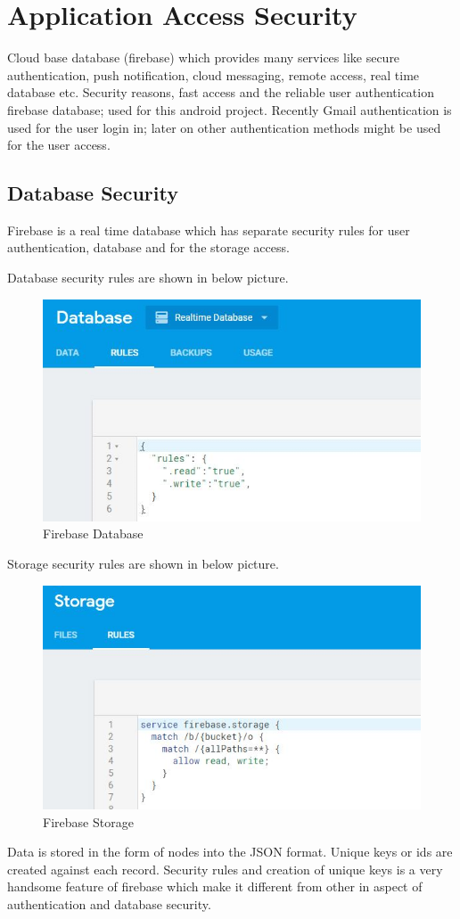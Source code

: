 \section{Application Access Security}
Cloud base database (firebase) which provides many services like secure authentication, push notification, cloud messaging, remote access, real time database etc. Security reasons, fast access and the reliable user authentication firebase database; used for this android project. Recently Gmail authentication is used for the user login in; later on other authentication methods might be used for the user access. 
\subsection{Database Security}
Firebase is a real time database which has separate security rules for user authentication, database and for the storage access. 

Database security rules are shown in below picture.

\begin{figure}[H]
 \centering
  \includegraphics[scale=0.3]{asd}
  \caption{Firebase Database}
\end{figure}
	
Storage security rules are shown in below picture.
\begin{figure}[H]
\centering
 \includegraphics[scale=0.3]{dfg}
  \caption{Firebase Storage}
\end{figure}
Data is stored in the form of nodes into the JSON format. Unique keys or ids are created against each record. Security rules and creation of unique keys is a very handsome feature of firebase which make it different from other in aspect of authentication and database security.